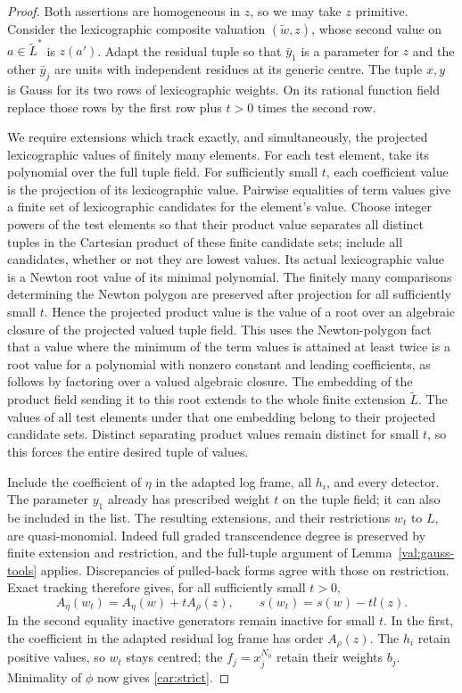 \begin{proof}
Both assertions are homogeneous in $z$, so we may take $z$ primitive.
Consider the lexicographic composite valuation $(\widetilde w,z)$,
whose second value on $a\in\widetilde L^*$ is $z(a')$. Adapt the
residual tuple so that $\bar y_1$ is a parameter for $z$ and the
other $\bar y_j$ are units with independent residues at its generic
centre. The tuple $x,y$ is Gauss for its two rows of lexicographic
weights. On its rational function field replace those rows by the
first row plus $t>0$ times the second row.

We require extensions which track exactly, and simultaneously, the
projected lexicographic values of finitely many elements. For each
test element, take its polynomial over the full tuple field. For
sufficiently small $t$, each coefficient value is the projection
of its lexicographic value. Pairwise equalities of term values give
a finite set of lexicographic candidates for the element's value.
Choose integer powers of the test elements so that their product
value separates all distinct tuples in the Cartesian product of
these finite candidate sets; include all candidates, whether or not
they are lowest values. Its actual lexicographic value is a Newton
root value of its minimal polynomial. The finitely many comparisons
determining the Newton polygon are preserved after projection for
all sufficiently small $t$. Hence the projected product value is
the value of a root over an algebraic closure of the projected
valued tuple field. This uses the Newton-polygon fact that a value
where the minimum of the term values is attained at least twice is
a root value for a polynomial with nonzero constant and leading
coefficients, as follows by factoring over a valued algebraic closure.
The embedding of the product field sending it to this root extends
to the whole finite extension $\widetilde L$. The values of all
test elements under that one embedding belong to their projected
candidate sets. Distinct separating product values remain distinct
for small $t$, so this forces the entire desired tuple of values.

Include the coefficient of $\eta$ in the adapted log frame, all
$h_i$, and every detector. The parameter $y_1$ already has prescribed
weight $t$ on the tuple field; it can also be included in the list.
The resulting extensions, and their restrictions $w_t$ to $L$,
are quasi-monomial. Indeed full graded transcendence degree is
preserved by finite extension and restriction, and the full-tuple
argument of Lemma~\ref{val:gauss-tools} applies. Discrepancies of
pulled-back forms agree with those on restriction. Exact tracking
therefore gives, for all sufficiently small $t>0$,
\begin{equation}\label{car:variation}
 A_\eta(w_t)=A_\eta(w)+tA_\rho(z),\qquad
 s(w_t)=s(w)-t l(z).
\end{equation}
In the second equality inactive generators remain inactive for
small $t$. In the first, the coefficient in the adapted residual
log frame has order $A_\rho(z)$. The $h_i$ retain positive values,
so $w_t$ stays centred; the $f_j=x_j^{N_0}$ retain their weights
$b_j$. Minimality of $\phi$ now gives \eqref{car:strict}.


\end{proof}
